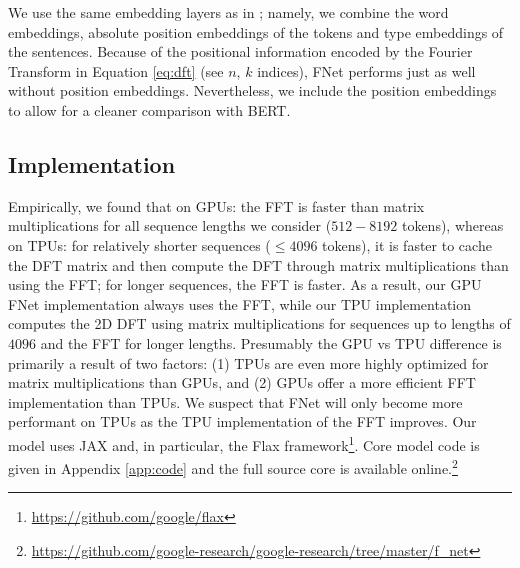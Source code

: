We use the same embedding layers as in \citet{devlin2018bert}; namely, we combine the word embeddings, absolute position embeddings of the tokens and type embeddings of the sentences. Because of the positional information encoded by the Fourier Transform in Equation \eqref{eq:dft} (see $n$, $k$ indices), FNet performs just as well without position embeddings. Nevertheless, we include the position embeddings to allow for a cleaner comparison with BERT.


\subsection{Implementation}
\label{subsec:implementation}

Empirically, we found that on GPUs: the FFT is faster than matrix multiplications for all sequence lengths we consider ($512 - 8192$ tokens), whereas on TPUs: for relatively shorter sequences ($\leq 4096$ tokens), it is faster to cache the DFT matrix and then compute the DFT through matrix multiplications than using the FFT; for longer sequences, the FFT is faster. As a result, our GPU FNet implementation always uses the FFT, while our TPU implementation computes the 2D DFT using matrix multiplications for sequences up to lengths of $4096$ and the FFT for longer lengths.
Presumably the GPU vs TPU difference is primarily a result of two factors: (1) TPUs are even more highly optimized for matrix multiplications than GPUs, and (2) GPUs offer a more efficient FFT implementation than TPUs. We suspect that FNet will only become more performant on TPUs as the TPU implementation of the FFT improves. Our model uses JAX and, in particular, the Flax framework\footnote{\url{https://github.com/google/flax}}. Core model code is given in Appendix \ref{app:code} and the full source core is available online.\footnote{\url{https://github.com/google-research/google-research/tree/master/f_net}}